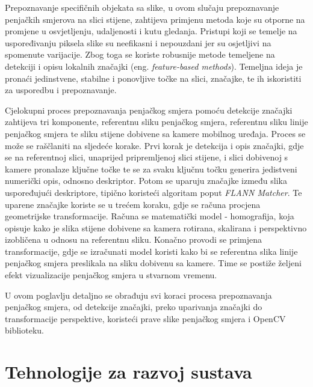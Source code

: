 Prepoznavanje specifičnih objekata sa slike, u ovom slučaju prepoznavanje penjačkih smjerova na slici stijene, zahtijeva primjenu metoda koje su otporne na promjene u osvjetljenju, udaljenosti i kutu gledanja. Pristupi koji se temelje na uspoređivanju piksela slike su neefikasni i nepouzdani jer su osjetljivi na spomenute varijacije. Zbog toga se koriste robusnije metode temeljene na detekciji i opisu lokalnih značajki (eng. \textit{feature-based methods}). Temeljna ideja je pronaći jedinstvene, stabilne i ponovljive točke na slici, značajke, te ih iskoristiti za usporedbu i prepoznavanje.

Cjelokupni proces prepoznavanja penjačkog smjera pomoću detekcije značajki zahtijeva tri komponente, referentnu sliku penjačkog smjera, referentnu sliku linije penjačkog smjera te sliku stijene dobivene sa kamere mobilnog uređaja. Proces se može se raščlaniti na sljedeće korake.
Prvi korak je detekcija i opis značajki, gdje se na referentnoj slici, unaprijed pripremljenoj slici stijene, i slici dobivenoj s kamere pronalaze ključne točke te se za svaku ključnu točku generira jedistveni numerički opis, odnosno deskriptor. Potom se uparuju značajke između slika uspoređujući deskriptore, tipično koristeći algoritam poput \textit{FLANN Matcher}. 
Te uparene značajke koriste se u trećem koraku, gdje se računa procjena geometrijske transformacije. Računa se matematički model - homografija, koja opisuje kako je slika stijene dobivene sa kamera rotirana, skalirana i perspektivno izobličena u odnosu na referentnu sliku. Konačno provodi se primjena transformacije, gdje se izračunati model koristi kako bi se referentna slika linije penjačkog smjera preslikala na sliku dobivenu sa kamere. Time se postiže željeni efekt vizualizacije penjačkog smjera u stvarnom vremenu.

U ovom poglavlju detaljno se obrađuju svi koraci procesa prepoznavanja penjačkog smjera, od detekcije značajki, preko uparivanja značajki do transformacije perspektive, koristeći prave slike penjačkog smjera i OpenCV biblioteku.





\section{Tehnologije za razvoj sustava}



 